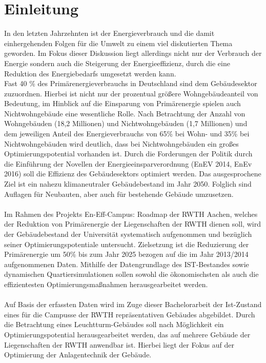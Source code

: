 \chapter{Einleitung}
\label{cha:Einleitung}

In den letzten Jahrzehnten ist der Energieverbrauch und die damit einhergehenden Folgen für die Umwelt zu einem viel diskutierten Thema geworden. Im Fokus dieser Diskussion liegt allerdings nicht nur der Verbrauch der Energie sondern auch die Steigerung der Energieeffizienz, durch die eine Reduktion des Energiebedarfs umgesetzt werden kann.\\
Fast 40 \% des Primärenergieverbrauchs in Deutschland sind dem Gebäudesektor zuzuordnen. Hierbei ist nicht nur der prozentual größere Wohngebäudeanteil von Bedeutung, im Hinblick auf die Einsparung von Primärenergie spielen auch Nichtwohngebäude eine wesentliche Rolle. Nach Betrachtung der Anzahl von Wohngebäuden (18,2 Millionen) und Nichtwohngebäuden (1,7 Millionen) und dem jeweiligen Anteil des Energieverbrauchs von 65\% bei Wohn- und 35\% bei Nichtwohngebäuden wird deutlich, dass bei Nichtwohngebäuden ein großes Optimierungspotential vorhanden ist. Durch die Forderungen der Politik durch die Einführung der Novellen der Energieeinsparverordnung (EnEV 2014, EnEv 2016) soll die Effizienz des Gebäudesektors optimiert werden. Das ausgesprochene Ziel ist ein nahezu klimaneutraler Gebäudebestand im Jahr 2050. Folglich sind Auflagen für Neubauten, aber auch für bestehende Gebäude umzusetzen. \\
\\
Im Rahmen des Projekts En-Eff-Campus: Roadmap der RWTH Aachen, welches der Reduktion von Primärenergie der Liegenschaften der RWTH dienen soll, wird der Gebäudebestand der Universität systematisch aufgenommen und bezüglich seiner Optimierungspotentiale untersucht. Zielsetzung ist die Reduzierung der Primärenergie um 50\% bis zum Jahr 2025 bezogen auf die im Jahr 2013/2014 aufgenommenen Daten. Mithilfe der Datengrundlage des IST-Bestandes sowie dynamischen Quartiersimulationen sollen sowohl die ökonomischsten als auch die effizientesten Optimierungsmaßnahmen herausgearbeitet werden. \\
\\
Auf Basis der erfassten Daten wird im Zuge dieser Bachelorarbeit der Ist-Zustand eines für die Campusse der RWTH repräsentativen Gebäudes abgebildet. Durch die Betrachtung eines Leuchtturm-Gebäudes soll nach Möglichkeit ein Optimierungspotential herausgearbeitet werden, das auf mehrere Gebäude der Liegenschaften der RWTH anwendbar ist. Hierbei liegt der Fokus auf der Optimierung der Anlagentechnik der Gebäude. \\

